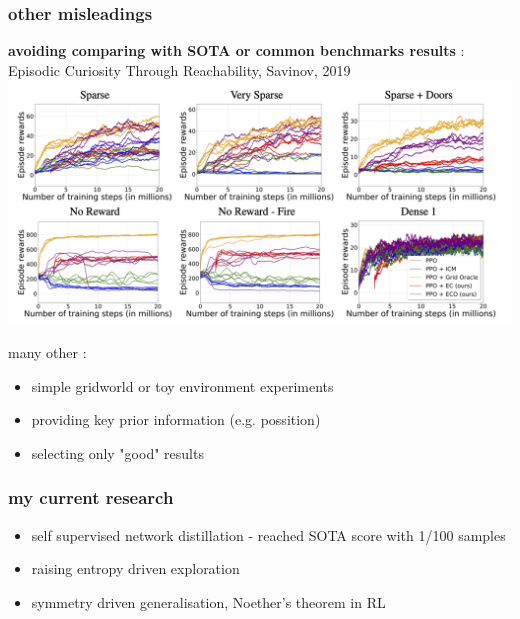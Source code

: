 \documentclass{beamer}
\begin{document}
\begin{frame}
  
  \frametitle{other misleadings}

  \centering
  {\bf avoiding comparing with SOTA or common benchmarks results} :
  Episodic Curiosity Through Reachability, Savinov, 2019 
  \includegraphics[scale=0.25]{../papers_captions/ecr.png}
  \bigskip

  many other :

  \begin{itemize}
    \item simple gridworld or toy environment experiments
    \item providing key prior information (e.g. possition)
    \item selecting only "good" results
  \end{itemize}

\end{frame}




\begin{frame}
  
  \frametitle{my current research}

    \begin{itemize}
      \item self supervised network distillation - reached SOTA score with 1/100 samples
      \item raising entropy driven exploration 
      \item symmetry driven generalisation, Noether's theorem in RL
    \end{itemize}

\end{frame}
\end{document}
